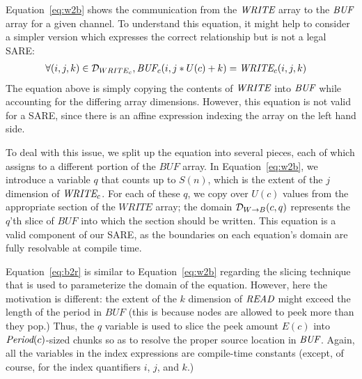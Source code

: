 Equation~\ref{eq:w2b} shows the communication from the $\mbox{\it WRITE}$
array to the $\mbox{\it BUF}$ array for a given channel.  To understand this
equation, it might help to consider a simpler version which expresses
the correct relationship but is not a legal SARE:
\begin{align*}
&\forall (i,j,k) \in {\cal D}_{WRITE_c},
\mbox{\it BUF}_{c}(i,j*U(c)+k) = \mbox{\it WRITE}_{c}(i, j, k)
\end{align*}
The equation above is simply copying the contents of $\mbox{\it WRITE}$ into
$\mbox{\it BUF}$ while accounting for the differing array dimensions.
However, this equation is not valid for a SARE, since there is an
affine expression indexing the array on the left hand side.

To deal with this issue, we split up the equation into several pieces,
each of which assigns to a different portion of the $BUF$ array.  In
Equation~\ref{eq:w2b}, we introduce a variable $q$ that counts up to
$S(n)$, which is the extent of the $j$ dimension of $\mbox{\it WRITE}_c$.
For each of these $q$, we copy over $U(c)$ values from the appropriate
section of the $WRITE$ array; the domain ${\cal D}_{W {\small
\rightarrow B}}(c,q)$ represents the $q$'th slice of $BUF$ into which
the section should be written.  This equation is a valid component of
our SARE, as the boundaries on each equation's domain are fully
resolvable at compile time.

Equation~\ref{eq:b2r} is similar to Equation~\ref{eq:w2b} regarding
the slicing technique that is used to parameterize the domain of the
equation.  However, here the motivation is different: the extent of
the $k$ dimension of $\mbox{\it READ}$ might exceed the length of the period
in $BUF$ (this is because nodes are allowed to peek more than they
pop.)  Thus, the $q$ variable is used to slice the peek amount $E(c)$
into $\mbox{\it Period}(c)$-sized chunks so as to resolve the proper source
location in $\mbox{\it BUF}$.  Again, all the variables in the index
expressions are compile-time constants (except, of course, for the
index quantifiers $i$, $j$, and $k$.)
